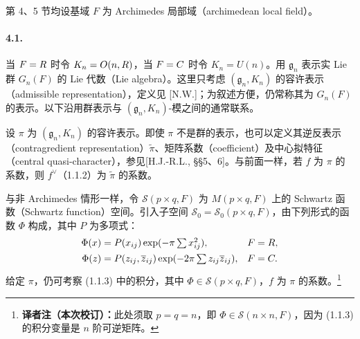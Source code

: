 第 4、5 节均设基域 $F$ 为 Archimedes 局部域（archimedean local field）。

\paragraph*{4.1.}
当 $F=R$ 时令 $K_n=O(n,R)$，当 $F=C$ 时令 $K_n=U(n)$。用 $\mathfrak g_n$ 表示实 Lie 群 $G_n(F)$ 的 Lie 代数（Lie algebra）。这里只考虑 $(\mathfrak g_n,K_n)$ 的容许表示（admissible representation），定义见 [N.W.]；为叙述方便，仍常称其为 $G_n(F)$ 的表示。以下沿用群表示与 $(\mathfrak g_n,K_n)$-模之间的通常联系。

设 $\pi$ 为 $(\mathfrak g_n,K_n)$ 的容许表示。即使 $\pi$ 不是群的表示，也可以定义其逆反表示（contragredient representation）$\widetilde\pi$、矩阵系数（coefficient）及中心拟特征（central quasi-character），参见[H.J.-R.L., §§5、6]。与前面一样，若 $f$ 为 $\pi$ 的系数，则 $f^\vee$（1.1.2）为 $\widetilde\pi$ 的系数。

与非 Archimedes 情形一样，令 $\mathcal S(p\times q,F)$ 为 $M(p\times q,F)$ 上的 Schwartz 函数（Schwartz function）空间。引入子空间 $\mathcal S_0=\mathcal S_0(p\times q,F)$，由下列形式的函数 $\Phi$ 构成，其中 $P$ 为多项式：
\[
\begin{aligned}
 \Phi(x)&=P(x_{ij})\exp(-\pi\textstyle\sum x_{ij}^2),&&F=R,\\
 \Phi(z)&=P(z_{ij},\overline z_{ij})\exp(-2\pi\textstyle\sum z_{ij}\overline z_{ij}),&&F=C.
\end{aligned}
\]
给定 $\pi$，仍可考察 (1.1.3) 中的积分，其中 $\Phi\in\mathcal S(p\times q,F)$，$f$ 为 $\pi$ 的系数。\footnote{\textbf{译者注（本次校订）：}此处须取 $p=q=n$，即 $\Phi\in\mathcal S(n\times n,F)$，因为 (1.1.3) 的积分变量是 $n$ 阶可逆矩阵。}

